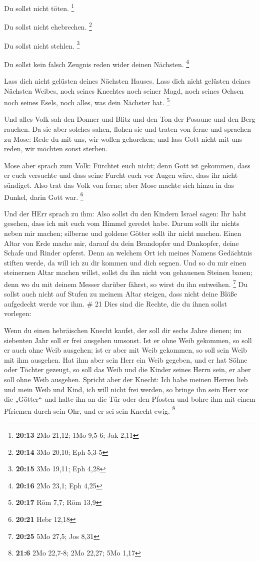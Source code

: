  Du sollst nicht töten. \footnote{\textbf{20:13} 2Mo 21,12;
  1Mo 9,5-6; Jak 2,11}

 Du sollst nicht ehebrechen. \footnote{\textbf{20:14} 3Mo
  20,10; Eph 5,3-5}

 Du sollst nicht stehlen. \footnote{\textbf{20:15} 3Mo
  19,11; Eph 4,28}

 Du sollst kein falsch Zeugnis reden wider deinen Nächsten.
\footnote{\textbf{20:16} 2Mo 23,1; Eph 4,25}

 Lass dich nicht gelüsten deines Nächsten Hauses. Lass dich
nicht gelüsten deines Nächsten Weibes, noch seines Knechtes noch seiner
Magd, noch seines Ochsen noch seines Esels, noch alles, was dein
Nächster hat. \footnote{\textbf{20:17} Röm 7,7; Röm 13,9}

 Und alles Volk sah den Donner und Blitz und den Ton der
Posaune und den Berg rauchen. Da sie aber solches sahen, flohen sie und
traten von ferne  und sprachen zu Mose: Rede du mit uns,
wir wollen gehorchen; und lass Gott nicht mit uns reden, wir möchten
sonst sterben.

 Mose aber sprach zum Volk: Fürchtet euch nicht; denn Gott
ist gekommen, dass er euch versuchte und dass seine Furcht euch vor
Augen wäre, dass ihr nicht sündiget.  Also trat das Volk
von ferne; aber Mose machte sich hinzu in das Dunkel, darin Gott war.
\footnote{\textbf{20:21} Hebr 12,18}

 Und der HErr sprach zu ihm: Also sollst du den Kindern
Israel sagen: Ihr habt gesehen, dass ich mit euch vom Himmel geredet
habe.  Darum sollt ihr nichts neben mir machen; silberne
und goldene Götter sollt ihr nicht machen.  Einen Altar von
Erde mache mir, darauf du dein Brandopfer und Dankopfer, deine Schafe
und Rinder opferst. Denn an welchem Ort ich meines Namens Gedächtnis
stiften werde, da will ich zu dir kommen und dich segnen. 
Und so du mir einen steinernen Altar machen willst, sollst du ihn nicht
von gehauenen Steinen bauen; denn wo du mit deinem Messer darüber
fährst, so wirst du ihn entweihen. \footnote{\textbf{20:25} 5Mo 27,5;
  Jos 8,31}  Du sollst auch nicht auf Stufen zu meinem
Altar steigen, dass nicht deine Blöße aufgedeckt werde vor ihm. \# 21
 Dies sind die Rechte, die du ihnen sollst vorlegen:

 Wenn du einen hebräischen Knecht kaufst, der soll dir sechs
Jahre dienen; im siebenten Jahr soll er frei ausgehen umsonst.
 Ist er ohne Weib gekommen, so soll er auch ohne Weib
ausgehen; ist er aber mit Weib gekommen, so soll sein Weib mit ihm
ausgehen.  Hat ihm aber sein Herr ein Weib gegeben, und er
hat Söhne oder Töchter gezeugt, so soll das Weib und die Kinder seines
Herrn sein, er aber soll ohne Weib ausgehen.  Spricht aber
der Knecht: Ich habe meinen Herren lieb und mein Weib und Kind, ich will
nicht frei werden,  so bringe ihn sein Herr vor die
„Götter`` und halte ihn an die Tür oder den Pfosten und bohre ihm mit
einem Pfriemen durch sein Ohr, und er sei sein Knecht ewig. \footnote{\textbf{21:6}
  2Mo 22,7-8; 2Mo 22,27; 5Mo 1,17}

